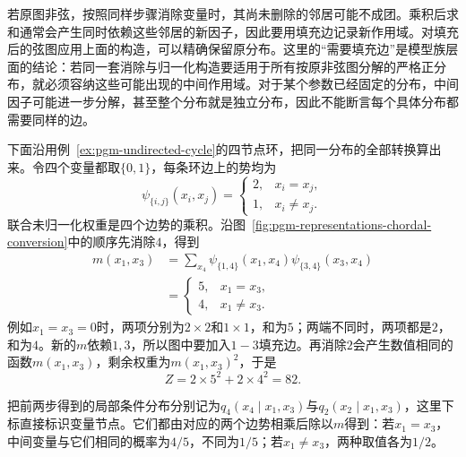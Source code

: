 若原图非弦，按照同样步骤消除变量时，其尚未删除的邻居可能不成团。乘积后求和通常会产生同时依赖这些邻居的新因子，因此要用填充边记录新作用域。对填充后的弦图应用上面的构造，可以精确保留原分布。这里的“需要填充边”是模型族层面的结论：若同一套消除与归一化构造要适用于所有按原非弦图分解的严格正分布，就必须容纳这些可能出现的中间作用域。对于某个参数已经固定的分布，中间因子可能进一步分解，甚至整个分布就是独立分布，因此不能断言每个具体分布都需要同样的边。

下面沿用例~\ref{ex:pgm-undirected-cycle}的四节点环，把同一分布的全部转换算出来。令四个变量都取$\{0,1\}$，每条环边上的势均为
\begin{equation}
  \psi_{\{i,j\}}(x_i,x_j)=
  \begin{cases}
    2,&x_i=x_j,\\
    1,&x_i\ne x_j.
  \end{cases}
  \label{eq:pgm-representations-cycle-potentials}
\end{equation}
联合未归一化权重是四个边势的乘积。沿图~\ref{fig:pgm-representations-chordal-conversion}中的顺序先消除$4$，得到
\begin{equation}
  \begin{aligned}
    m(x_1,x_3)
    &=\sum_{x_4}\psi_{\{1,4\}}(x_1,x_4)
    \psi_{\{3,4\}}(x_3,x_4)\\
    &=
    \begin{cases}
      5,&x_1=x_3,\\
      4,&x_1\ne x_3.
    \end{cases}
  \end{aligned}
  \label{eq:pgm-representations-cycle-message}
\end{equation}
例如$x_1=x_3=0$时，两项分别为$2\times2$和$1\times1$，和为$5$；两端不同时，两项都是$2$，和为$4$。新的$m$依赖$1,3$，所以图中要加入$1-3$填充边。再消除$2$会产生数值相同的函数$m(x_1,x_3)$，剩余权重为$m(x_1,x_3)^2$，于是
\[
  Z=2\times5^2+2\times4^2=82.
\]

把前两步得到的局部条件分布分别记为$q_4(x_4\mid x_1,x_3)$与$q_2(x_2\mid x_1,x_3)$，这里下标直接标识变量节点。它们都由对应的两个边势相乘后除以$m$得到：若$x_1=x_3$，中间变量与它们相同的概率为$4/5$，不同为$1/5$；若$x_1\ne x_3$，两种取值各为$1/2$。

